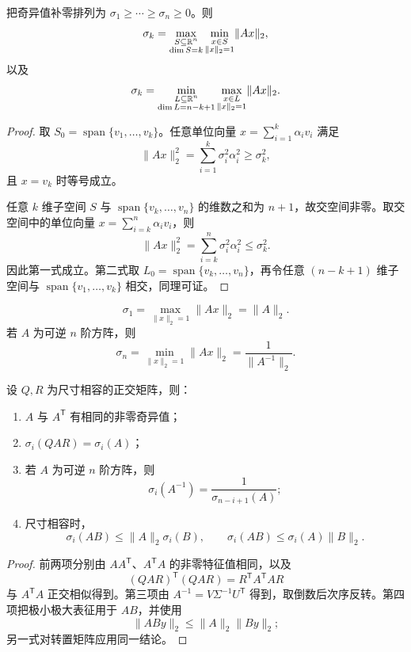 \begin{theorem}[奇异值的极小极大表征]
把奇异值补零排列为 $\sigma_1\ge\cdots\ge\sigma_n\ge0$。则
\[
\sigma_k
=\max_{\substack{S\subseteq\mathbb{R}^n\\\dim S=k}}
\min_{\substack{x\in S\\\lVert x\rVert_2=1}}
\lVert Ax\rVert_2,
\]
以及
\[
\sigma_k
=\min_{\substack{L\subseteq\mathbb{R}^n\\\dim L=n-k+1}}
\max_{\substack{x\in L\\\lVert x\rVert_2=1}}
\lVert Ax\rVert_2.
\]
\end{theorem}
\begin{proof}
取 $S_0=\operatorname{span}\{v_1,\ldots,v_k\}$。任意单位向量
$x=\sum_{i=1}^k\alpha_iv_i$ 满足
\[
\lVert Ax\rVert_2^2=\sum_{i=1}^k\sigma_i^2\alpha_i^2
\ge\sigma_k^2,
\]
且 $x=v_k$ 时等号成立。

任意 $k$ 维子空间 $S$ 与
$\operatorname{span}\{v_k,\ldots,v_n\}$ 的维数之和为 $n+1$，故交空间非零。取交空间中的单位向量
$x=\sum_{i=k}^n\alpha_iv_i$，则
\[
\lVert Ax\rVert_2^2=\sum_{i=k}^n\sigma_i^2\alpha_i^2
\le\sigma_k^2.
\]
因此第一式成立。第二式取
$L_0=\operatorname{span}\{v_k,\ldots,v_n\}$，再令任意 $(n-k+1)$ 维子空间与
$\operatorname{span}\{v_1,\ldots,v_k\}$ 相交，同理可证。
\end{proof}

\begin{corollary}[最大与最小伸缩]
\[
\sigma_1=\max_{\lVert x\rVert_2=1}\lVert Ax\rVert_2=\lVert A\rVert_2.
\]
若 $A$ 为可逆 $n$ 阶方阵，则
\[
\sigma_n=\min_{\lVert x\rVert_2=1}\lVert Ax\rVert_2
=\frac1{\lVert A^{-1}\rVert_2}.
\]
\end{corollary}

\begin{proposition}[奇异值的常用性质]
设 $Q,R$ 为尺寸相容的正交矩阵，则：
\begin{enumerate}
\item $A$ 与 $A^{\mathsf T}$ 有相同的非零奇异值；
\item $\sigma_i(QAR)=\sigma_i(A)$；
\item 若 $A$ 为可逆 $n$ 阶方阵，则
\[
\sigma_i(A^{-1})=\frac1{\sigma_{n-i+1}(A)};
\]
\item 尺寸相容时，
\[
\sigma_i(AB)\le\lVert A\rVert_2\sigma_i(B),
\qquad
\sigma_i(AB)\le\sigma_i(A)\lVert B\rVert_2.
\]
\end{enumerate}
\end{proposition}
\begin{proof}
前两项分别由 $AA^{\mathsf T}$、$A^{\mathsf T}A$ 的非零特征值相同，以及
\[
(QAR)^{\mathsf T}(QAR)=R^{\mathsf T}A^{\mathsf T}AR
\]
与 $A^{\mathsf T}A$ 正交相似得到。第三项由
$A^{-1}=V\Sigma^{-1}U^{\mathsf T}$ 得到，取倒数后次序反转。第四项把极小极大表征用于 $AB$，并使用
\[
\lVert ABy\rVert_2\le\lVert A\rVert_2\lVert By\rVert_2;
\]
另一式对转置矩阵应用同一结论。
\end{proof}

